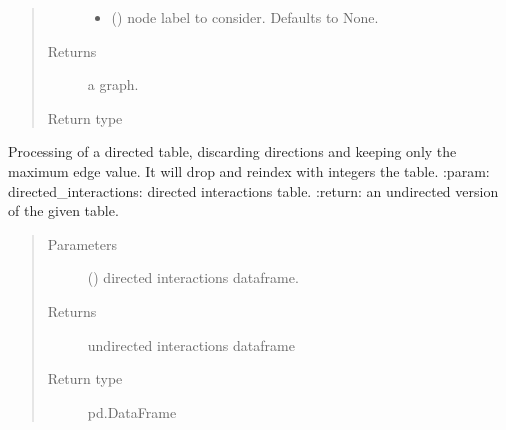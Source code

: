 \documentclass[letterpaper,10pt,english]{sphinxmanual}
\begin{document}
\begin{fulllineitems}
\begin{fulllineitems}
\begin{quote}
\begin{description}
\begin{itemize}
\item {} 
 (\sphinxstyleliteralemphasis{\sphinxupquote{, }}) \textendash{} node label to consider.
Defaults to None.

\end{itemize}

\item[{Returns}] \leavevmode
a graph.

\item[{Return type}] \leavevmode
{\hyperref[\detokenize{_modules/cosifer.collections:cosifer.collections.graph.Graph}]{}}

\end{description}\end{quote}

\end{fulllineitems}


\end{fulllineitems}


\begin{fulllineitems}
\label{\detokenize{_modules/cosifer.collections:cosifer.collections.interaction_table.directed_to_undirected_interactions}}
Processing of a directed table, discarding directions and keeping only
the maximum edge value. It will drop and reindex with integers the table.
:param: directed\_interactions: directed interactions table.
:return: an undirected version of the given table.
\begin{quote}\begin{description}
\item[{Parameters}] \leavevmode
{} () \textendash{} directed interactions dataframe.

\item[{Returns}] \leavevmode
undirected interactions dataframe

\item[{Return type}] \leavevmode
pd.DataFrame

\end{description}\end{quote}

\end{fulllineitems}
\end{document}
